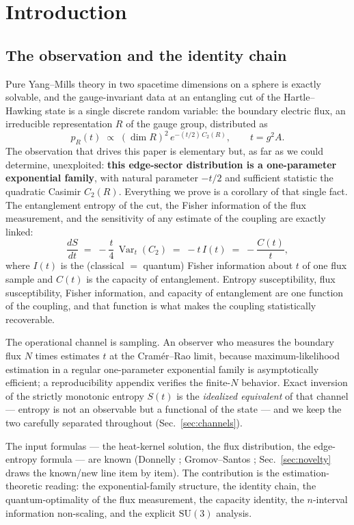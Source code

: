 \documentclass[11pt]{article}
\theoremstyle{remark}
\theoremstyle{plain}
\newcommand{\Var}{\operatorname{Var}}
\begin{document}
\section{Introduction}

\subsection{The observation and the identity chain}

Pure Yang--Mills theory in two spacetime dimensions on a sphere is exactly solvable, and the gauge-invariant data at an entangling cut of the Hartle--Hawking state is a single discrete random variable: the boundary electric flux, an irreducible representation $R$ of the gauge group, distributed as
\[
p_R(t) \;\propto\; (\dim R)^2\, e^{-(t/2)\,C_2(R)}, \qquad t = g^2 A.
\]
The observation that drives this paper is elementary but, as far as we could determine, unexploited: \textbf{this edge-sector distribution is a one-parameter exponential family}, with natural parameter $-t/2$ and sufficient statistic the quadratic Casimir $C_2(R)$. Everything we prove is a corollary of that single fact. The entanglement entropy of the cut, the Fisher information of the flux measurement, and the sensitivity of any estimate of the coupling are exactly linked:
\[
\frac{dS}{dt} \;=\; -\frac{t}{4}\,\Var_t(C_2) \;=\; -t\, I(t) \;=\; -\frac{C(t)}{t},
\]
where $I(t)$ is the (classical $=$ quantum) Fisher information about $t$ of one flux sample and $C(t)$ is the capacity of entanglement. Entropy susceptibility, flux susceptibility, Fisher information, and capacity of entanglement are one function of the coupling, and that function is what makes the coupling statistically recoverable.

The operational channel is sampling. An observer who measures the boundary flux $N$ times estimates $t$ at the Cram\'er--Rao limit, because maximum-likelihood estimation in a regular one-parameter exponential family is asymptotically efficient; a reproducibility appendix verifies the finite-$N$ behavior. Exact inversion of the strictly monotonic entropy $S(t)$ is the \emph{idealized equivalent} of that channel --- entropy is not an observable but a functional of the state --- and we keep the two carefully separated throughout (Sec.~\ref{sec:channels}).

The input formulas --- the heat-kernel solution, the flux distribution, the edge-entropy formula --- are known (Donnelly \cite{D14}; Gromov--Santos \cite{GS14}; Sec.~\ref{sec:novelty} draws the known/new line item by item). The contribution is the estimation-theoretic reading: the exponential-family structure, the identity chain, the quantum-optimality of the flux measurement, the capacity identity, the $n$-interval information non-scaling, and the explicit $\mathrm{SU}(3)$ analysis.
\end{document}
